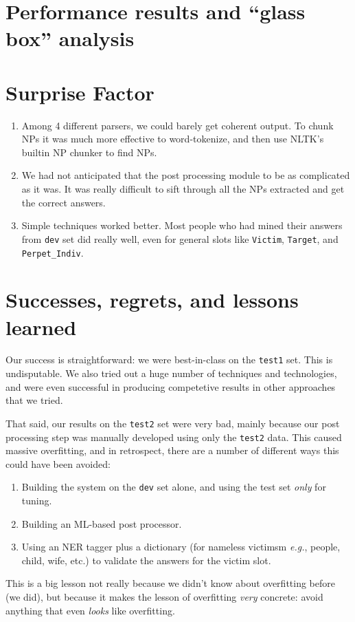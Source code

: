 \documentclass[11pt]{myclass}
\begin{document}
\section{Performance results and “glass box” analysis}

\section{Surprise Factor}

\begin{enumerate}

\item Among 4 different parsers, we could barely get coherent output. To chunk NPs it was much more effective to word-tokenize, and then use NLTK's builtin NP chunker to find NPs.

\item We had not anticipated that the post processing module to be as complicated as it was. It was really difficult to sift through all the NPs extracted and get the correct answers.

\item Simple techniques worked better. Most people who had mined their answers from \texttt{dev} set did really well, even for general slots like \texttt{Victim}, \texttt{Target}, and \texttt{Perpet\_Indiv}.

\end{enumerate}

\section{Successes, regrets, and lessons learned}

Our success is straightforward: we were best-in-class on the \texttt{test1} set. This is undisputable. We also tried out a huge number of techniques and technologies, and were even successful in producing competetive results in other approaches that we tried.

That said, our results on the \texttt{test2} set were very bad, mainly because our post processing step was manually developed using only the \texttt{test2} data. This caused massive overfitting, and in retrospect, there are a number of different ways this could have been avoided:

\begin{enumerate}

\item Building the system on the \texttt{dev} set alone, and using the test set \textit{only} for tuning.
\item Building an ML-based post processor.
\item Using an NER tagger plus a dictionary (for nameless victimsm \textit{e.g.}, people, child, wife, etc.) to validate the answers for the victim slot.

\end{enumerate}


This is a big lesson not really because we didn't know about overfitting before (we did), but because it makes the lesson of overfitting \textit{very} concrete: avoid anything that even \textit{looks} like overfitting.
\end{document}
